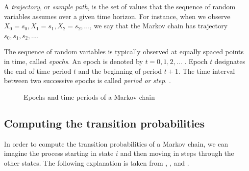 \documentclass[\main/main.tex]{subfiles}
\begin{document}
A \textit{trajectory}, or \textit{sample path}, is the set of values that the sequence of random variables assumes over a given time horizon. For instance, when we observe $X_0 = s_0, X_1 = s_1, X_2 = s_2, ...$, we say that the Markov chain has trajectory $s_0, s_1, s_2,...$. 

The sequence of random variables is typically observed at equally spaced points in time, called 
\textit{epochs}. An epoch is denoted by $t = 0, 1, 2, ...$ . Epoch $t$ designates the end of time period $t$ and the beginning of period $t + 1$. The time interval between two successive epochs is called \textit{period or step}. \citep{Sheskin2010}.\\


\begin{figure}[H]
\centering
{}
\caption{Epochs and time periods of a Markov chain}
\label{fig:markov_chain}
\end{figure}


\subsection{Computing the transition probabilities}
In order to compute the transition probabilities of a Markov chain, we can imagine the process starting in state $i$ and then moving in steps through the other states. The following explanation is taken from \cite{Sheskin2010}, \cite{Howard1960}, and \cite{Holmes2015}. \\
\end{document}
